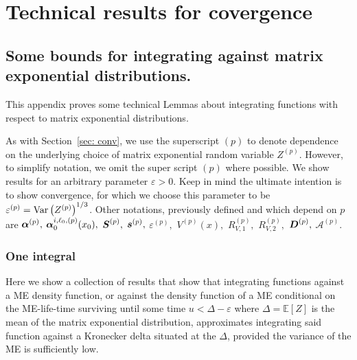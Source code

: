 \chapter{Technical results for covergence\label{app:tand}}
\section{Some bounds for integrating against matrix exponential distributions.}\label{appendix: bounds}
This appendix proves some technical Lemmas about integrating functions with respect to matrix exponential distributions. 

As with Section~\ref{sec: conv}, we use the superscript \((p)\) to denote dependence on the underlying choice of matrix exponential random variable \(Z^{(p)}\). However, to simplify notation, we omit the super script \((p)\) where possible. We show results for an arbitrary parameter \(\varepsilon>0\). Keep in mind the ultimate intention is to show convergence, for which we choose this parameter to be \(\varepsilon^{(p)}=\mathrm{Var}\left(Z^{(p)}\right)^{1/3}\). Other notations, previously defined and which depend on \(p\) are \(\boldsymbol\alpha^{(p)},\) \(\boldsymbol \alpha_0^{i,\ell_0,(p)}(x_0),\) \(\boldsymbol S^{(p)},\) \(\boldsymbol s^{(p)},\) \(\varepsilon^{(p)},\) \(V^{(p)}(x),\) \(R_{V,1}^{(p)},\) \(R_{V,2}^{(p)},\) \(\boldsymbol D^{(p)},\) \( \mathcal A^{(p)}\).

\subsection{One integral}\label{appendix: int one}
 Here we show a collection of results that show that integrating functions against a ME density function, or against the density function of a ME conditional on the ME-life-time surviving until some time \(u<\Delta-\varepsilon\) where \(\Delta = \mathbb E[Z]\) is the mean of the matrix exponential distribution, approximates integrating said function against a Kronecker delta situated at the \(\Delta\), provided the variance of the ME is sufficiently low. %
  
